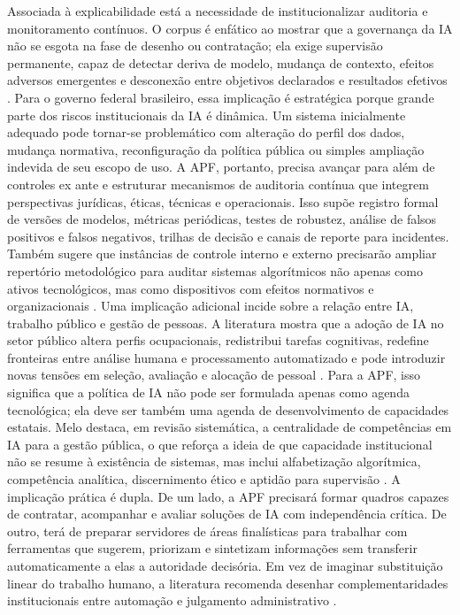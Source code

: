 \documentclass[12pt,a4paper]{article}
\begin{document}
Associada à explicabilidade está a necessidade de institucionalizar auditoria e monitoramento contínuos. O corpus é enfático ao mostrar que a governança da IA não se esgota na fase de desenho ou contratação; ela exige supervisão permanente, capaz de detectar deriva de modelo, mudança de contexto, efeitos adversos emergentes e desconexão entre objetivos declarados e resultados efetivos \autocite{mkander2023auditing} \autocite{minkkinen2022continuous}. Para o governo federal brasileiro, essa implicação é estratégica porque grande parte dos riscos institucionais da IA é dinâmica. Um sistema inicialmente adequado pode tornar-se problemático com alteração do perfil dos dados, mudança normativa, reconfiguração da política pública ou simples ampliação indevida de seu escopo de uso. A APF, portanto, precisa avançar para além de controles ex ante e estruturar mecanismos de auditoria contínua que integrem perspectivas jurídicas, éticas, técnicas e operacionais. Isso supõe registro formal de versões de modelos, métricas periódicas, testes de robustez, análise de falsos positivos e falsos negativos, trilhas de decisão e canais de reporte para incidentes. Também sugere que instâncias de controle interno e externo precisarão ampliar repertório metodológico para auditar sistemas algorítmicos não apenas como ativos tecnológicos, mas como dispositivos com efeitos normativos e organizacionais \autocite{mkander2023auditing}.
Uma implicação adicional incide sobre a relação entre IA, trabalho público e gestão de pessoas. A literatura mostra que a adoção de IA no setor público altera perfis ocupacionais, redistribui tarefas cognitivas, redefine fronteiras entre análise humana e processamento automatizado e pode introduzir novas tensões em seleção, avaliação e alocação de pessoal \autocite{chilunjika2022artificial} \autocite{cho2023human} \autocite{barros2025inteligencia}. Para a APF, isso significa que a política de IA não pode ser formulada apenas como agenda tecnológica; ela deve ser também uma agenda de desenvolvimento de capacidades estatais. Melo destaca, em revisão sistemática, a centralidade de competências em IA para a gestão pública, o que reforça a ideia de que capacidade institucional não se resume à existência de sistemas, mas inclui alfabetização algorítmica, competência analítica, discernimento ético e aptidão para supervisão \autocite{melo2026competencias}. A implicação prática é dupla. De um lado, a APF precisará formar quadros capazes de contratar, acompanhar e avaliar soluções de IA com independência crítica. De outro, terá de preparar servidores de áreas finalísticas para trabalhar com ferramentas que sugerem, priorizam e sintetizam informações sem transferir automaticamente a elas a autoridade decisória. Em vez de imaginar substituição linear do trabalho humano, a literatura recomenda desenhar complementaridades institucionais entre automação e julgamento administrativo \autocite{criado2024artificial} \autocite{madan2022ai}.
\end{document}
